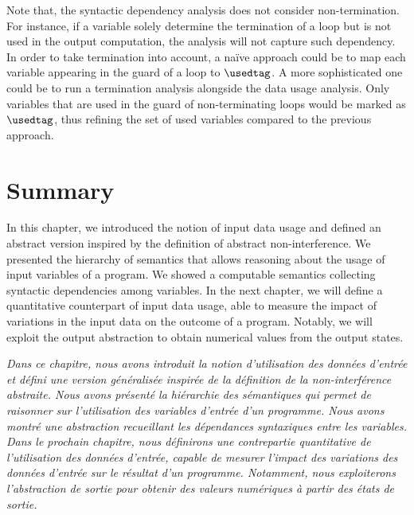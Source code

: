 Note that, the syntactic dependency analysis does not consider non-termination. For instance, if a variable solely determine the termination of a loop but is not used in the output computation, the analysis will not capture such dependency.
In order to take termination into account, a na\"ive approach could be to map each variable appearing in the guard of a loop to $\usedtag$. A more sophisticated one could be to run a termination analysis alongside the data usage analysis.
Only variables that are used in the guard of non-terminating loops would be marked as $\usedtag$, thus refining the set of used variables compared to the previous approach.

\section{Summary}

In this chapter, we introduced the notion of input data usage and defined an abstract version inspired by the definition of abstract non-interference.
We presented the hierarchy of semantics that allows reasoning about the usage of input variables of a program.
We showed a computable semantics collecting syntactic dependencies among variables.
In the next chapter, we will define a quantitative counterpart of input data usage, able to measure the impact of variations in the input data on the outcome of a program.
Notably, we will exploit the output abstraction to obtain numerical values from the output states.

\frenchdiv

\emph{Dans ce chapitre, nous avons introduit la notion d'utilisation des données d'entrée et défini une version généralisée inspirée de la définition de la non-interférence abstraite. Nous avons présenté la hiérarchie des sémantiques qui permet de raisonner sur l'utilisation des variables d'entrée d'un programme. Nous avons montré une abstraction recueillant les dépendances syntaxiques entre les variables. Dans le prochain chapitre, nous définirons une contrepartie quantitative de l'utilisation des données d'entrée, capable de mesurer l'impact des variations des données d'entrée sur le résultat d'un programme. Notamment, nous exploiterons l'abstraction de sortie pour obtenir des valeurs numériques à partir des états de sortie.}
